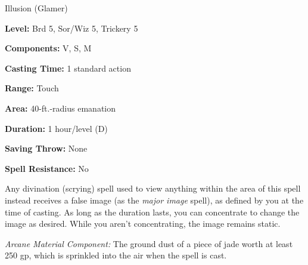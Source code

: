 
Illusion (Glamer)

\textbf{Level:} Brd 5, Sor/Wiz 5, Trickery 5

\textbf{Components:} V, S, M

\textbf{Casting Time:} 1 standard action

\textbf{Range:} Touch

\textbf{Area:} 40-ft.-radius emanation

\textbf{Duration:} 1 hour/level (D)

\textbf{Saving Throw:} None

\textbf{Spell Resistance:} No

Any divination (scrying) spell used to view anything within the area of this spell 
instead receives a false image (as the \textit{major image} spell), as defined 
by you at the time of casting. As long as the duration lasts, you can concentrate 
to change the image as desired. While you aren't concentrating, the image remains 
static.

\textit{Arcane Material Component:} The ground dust of a piece of jade worth at 
least 250 gp, which is sprinkled into the air when the spell is cast.

